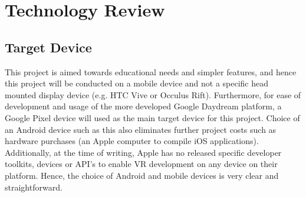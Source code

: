 \documentclass[11pt]{report}
\begin{document}
\chapter{Technology Review}
\section{Target Device}
This project is aimed towards educational needs and simpler features, and hence this project will be conducted on a mobile device and not a specific head mounted display device (e.g. HTC Vive or Occulus Rift). Furthermore, for ease of development and usage of the more developed Google Daydream platform, a Google Pixel device will used as the main target device for this project. Choice of an Android device such as this also eliminates further project costs such as hardware purchases (an Apple computer to compile iOS applications). Additionally, at the time of writing, Apple has no released specific developer toolkits, devices or API's to enable VR development on any device on their platform. Hence, the choice of Android and mobile devices is very clear and straightforward.
\end{document}
